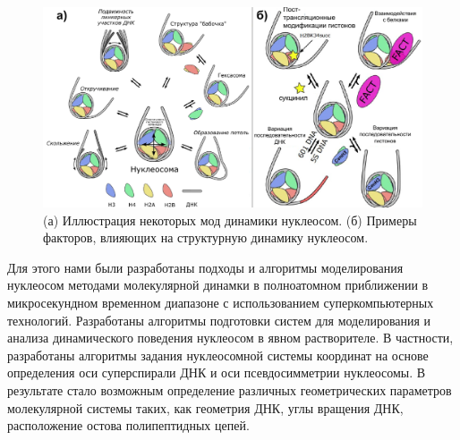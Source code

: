 \begin{figure} [h!]
    \centering
    \includegraphics [width=\textwidth]{images/p2/cosb/part2_1_f2_synopsis.pdf}
    \caption[Моды динамики нуклеосом]{(а) Иллюстрация некоторых мод динамики нуклеосом. (б) Примеры факторов, влияющих на структурную динамику нуклеосом.}
    \label{fig:part2_1_f2}
\end{figure}

Для этого нами были разработаны подходы и алгоритмы моделирования нуклеосом методами молекулярной динамки в полноатомном приближении в микросекундном временном диапазоне с использованием суперкомпьютерных технологий. Разработаны алгоритмы подготовки систем для моделирования и анализа динамического поведения нуклеосом в явном растворителе. В частности, разработаны алгоритмы задания нуклеосомной системы координат на основе определения оси суперспирали ДНК и оси псевдосимметрии нуклеосомы. В результате стало возможным определение различных геометрических параметров молекулярной системы таких, как геометрия ДНК, углы вращения ДНК, расположение остова полипептидных цепей.
  

